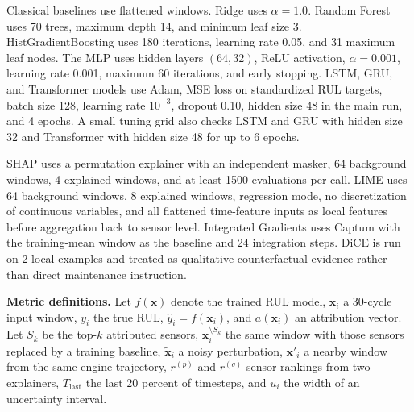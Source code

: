 \documentclass[conference]{IEEEtran}
\begin{document}
Classical baselines use flattened windows. Ridge uses \(\alpha=1.0\). Random Forest uses 70 trees, maximum depth 14, and minimum leaf size 3. HistGradientBoosting uses 180 iterations, learning rate 0.05, and 31 maximum leaf nodes. The MLP uses hidden layers \((64,32)\), ReLU activation, \(\alpha=0.001\), learning rate 0.001, maximum 60 iterations, and early stopping. LSTM, GRU, and Transformer models use Adam, MSE loss on standardized RUL targets, batch size 128, learning rate \(10^{-3}\), dropout 0.10, hidden size 48 in the main run, and 4 epochs. A small tuning grid also checks LSTM and GRU with hidden size 32 and Transformer with hidden size 48 for up to 6 epochs.

SHAP uses a permutation explainer with an independent masker, 64 background windows, 4 explained windows, and at least 1500 evaluations per call. LIME uses 64 background windows, 8 explained windows, regression mode, no discretization of continuous variables, and all flattened time-feature inputs as local features before aggregation back to sensor level. Integrated Gradients uses Captum with the training-mean window as the baseline and 24 integration steps. DiCE is run on 2 local examples and treated as qualitative counterfactual evidence rather than direct maintenance instruction.

\noindent\textbf{Metric definitions.}
Let \(f(\mathbf{x})\) denote the trained RUL model, \(\mathbf{x}_i\) a 30-cycle input window, \(y_i\) the true RUL, \(\hat{y}_i=f(\mathbf{x}_i)\), and \(a(\mathbf{x}_i)\) an attribution vector. Let \(S_k\) be the top-\(k\) attributed sensors, \(\mathbf{x}^{\setminus S_k}_i\) the same window with those sensors replaced by a training baseline, \(\tilde{\mathbf{x}}_i\) a noisy perturbation, \(\mathbf{x}'_i\) a nearby window from the same engine trajectory, \(r^{(p)}\) and \(r^{(q)}\) sensor rankings from two explainers, \(T_{\mathrm{last}}\) the last 20 percent of timesteps, and \(u_i\) the width of an uncertainty interval.
\end{document}
